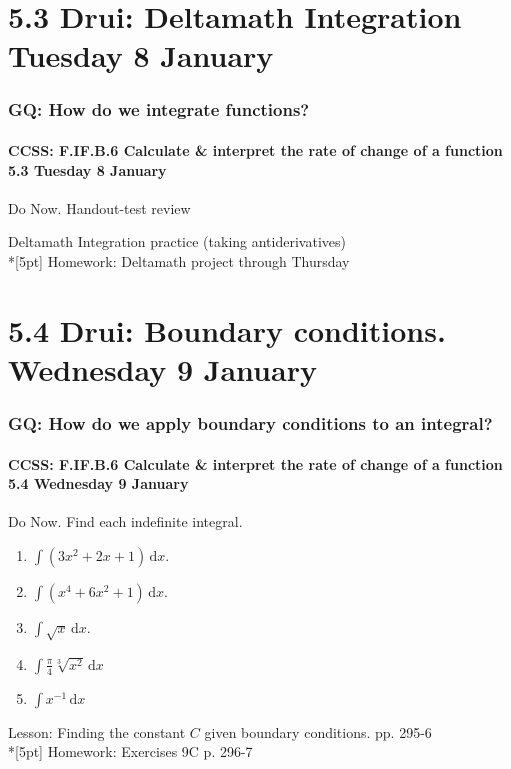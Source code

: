 \documentclass{beamer}
\begin{document}
\section{5.3 Drui: Deltamath Integration Tuesday 8 January}
\frame
{
  \frametitle{GQ: How do we integrate functions?}
  \framesubtitle{CCSS: F.IF.B.6 Calculate \& interpret the rate of change of a function  \alert{5.3  Tuesday 8 January}}

  \begin{block}{Do Now. Handout-test review}

  \end{block}
  Deltamath Integration practice (taking antiderivatives)\\*[5pt]
  Homework: Deltamath project through Thursday
}

\section{5.4 Drui: Boundary conditions. Wednesday 9 January}
\frame
{
  \frametitle{GQ: How do we apply boundary conditions to an integral?}
  \framesubtitle{CCSS: F.IF.B.6 Calculate \& interpret the rate of change of a function  \alert{5.4 Wednesday 9 January}}

  \begin{block}{Do Now. Find each indefinite integral.}
  \begin{enumerate}
      \item $\int (3x^2+2x+1) \,\mathrm{d}x$.
      \item $\int (x^4+6x^2+1) \,\mathrm{d}x$.
      \item $\int \sqrt{x} \,\mathrm{d}x$.
      \item $\displaystyle \int \frac{\pi}{4} \sqrt[3]{x^2} \,\mathrm{d}x$
      \item $\int x^{-1} \,\mathrm{d}x$
  \end{enumerate}
  \end{block}
  Lesson: Finding the constant $C$ given boundary conditions. pp. 295-6\\*[5pt]
  Homework: Exercises 9C p. 296-7
}
\end{document}
